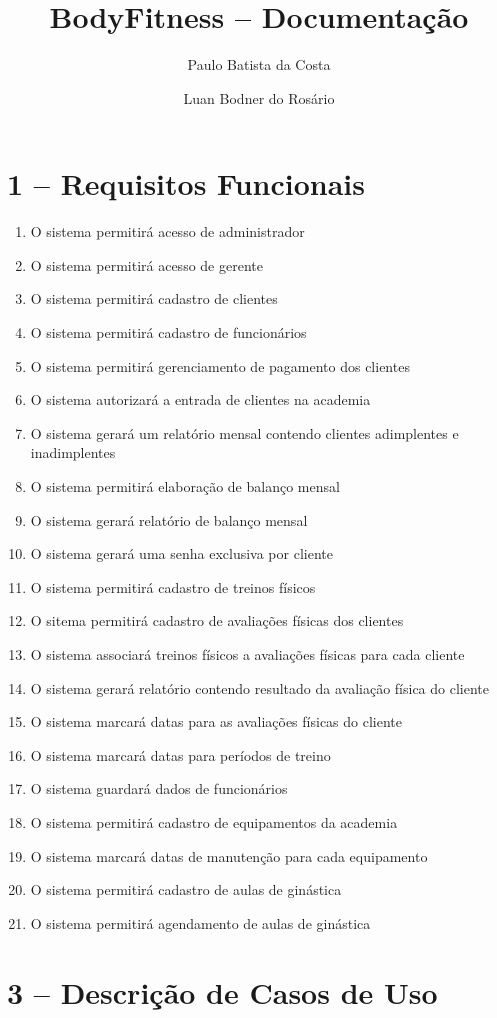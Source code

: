 \documentclass[12pt,a4paper,oneside]{report}
\author{Paulo Batista da Costa \and Luan Bodner do Rosário}
\title{BodyFitness -- Documentação}
\begin{document}
	\maketitle
	\section*{1 -- Requisitos Funcionais}

	\begin{enumerate}
		
		 \item O sistema permitirá acesso de administrador
		 \item O sistema permitirá acesso de gerente
		 \item O sistema permitirá cadastro de clientes
		 \item O sistema permitirá cadastro de funcionários
		 \item O sistema permitirá gerenciamento de pagamento dos clientes
		 \item O sistema autorizará a entrada de clientes na academia
		 \item O sistema gerará um relatório mensal contendo clientes adimplentes e inadimplentes 
		 \item O sistema permitirá elaboração de balanço mensal
		 \item O sistema gerará relatório de balanço mensal
		 \item O sistema gerará uma senha exclusiva por cliente
		 \item O sistema permitirá cadastro de treinos físicos
		 \item O sitema permitirá cadastro de avaliações físicas dos clientes
		 \item O sistema associará treinos físicos a avaliações físicas para cada cliente
		 \item O sistema gerará relatório contendo resultado da avaliação física do cliente
		 \item O sistema marcará datas para as avaliações físicas do cliente
		 \item O sistema marcará datas para períodos de treino
		 \item O sistema guardará dados de funcionários
		 \item O sistema permitirá cadastro de equipamentos da academia
		 \item O sistema marcará datas de manutenção para cada equipamento
		 \item O sistema permitirá cadastro de aulas de ginástica
		 \item O sistema permitirá agendamento de aulas de ginástica
	

	\end{enumerate}
	\section*{3 -- Descrição de Casos de Uso}
	
\end{document}

